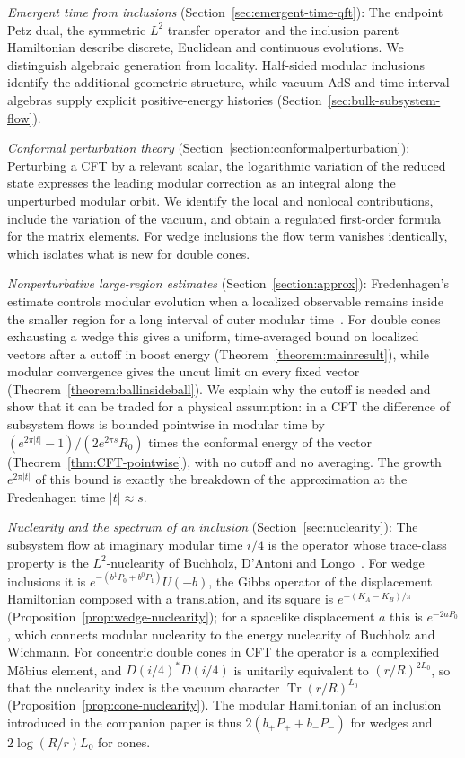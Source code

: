 \documentclass[a4paper,11pt]{article}
\theoremstyle{definition}
\begin{document}
\emph{Emergent time from inclusions} (Section~\ref{sec:emergent-time-qft}): The endpoint Petz dual, the symmetric $L^2$ transfer operator and the inclusion parent Hamiltonian describe discrete, Euclidean and continuous evolutions. We distinguish algebraic generation from locality. Half-sided modular inclusions identify the additional geometric structure, while vacuum AdS and time-interval algebras supply explicit positive-energy histories (Section~\ref{sec:bulk-subsystem-flow}).

\emph{Conformal perturbation theory} (Section~\ref{section:conformalperturbation}): Perturbing a CFT by a relevant scalar, the logarithmic variation of the reduced state expresses the leading modular correction as an integral along the unperturbed modular orbit. We identify the local and nonlocal contributions, include the variation of the vacuum, and obtain a regulated first-order formula for the matrix elements. For wedge inclusions the flow term vanishes identically, which isolates what is new for double cones.

\emph{Nonperturbative large-region estimates} (Section~\ref{section:approx}): Fredenhagen's estimate controls modular evolution when a localized observable remains inside the smaller region for a long interval of outer modular time~\cite{fredenhagen}. For double cones exhausting a wedge this gives a uniform, time-averaged bound on localized vectors after a cutoff in boost energy (Theorem~\ref{theorem:mainresult}), while modular convergence gives the uncut limit on every fixed vector (Theorem~\ref{theorem:ballinsideball}). We explain why the cutoff is needed and show that it can be traded for a physical assumption: in a CFT the difference of subsystem flows is bounded pointwise in modular time by $(e^{2\pi|t|}-1)/(2e^{2\pi s}R_0)$ times the conformal energy of the vector (Theorem~\ref{thm:CFT-pointwise}), with no cutoff and no averaging. The growth $e^{2\pi|t|}$ of this bound is exactly the breakdown of the approximation at the Fredenhagen time $|t|\approx s$.

\emph{Nuclearity and the spectrum of an inclusion} (Section~\ref{sec:nuclearity}): The subsystem flow at imaginary modular time $i/4$ is the operator whose trace-class property is the $L^2$-nuclearity of Buchholz, D'Antoni and Longo~\cite{BDL2007}. For wedge inclusions it is $e^{-(b^1P_0+b^0P_1)}U(-b)$, the Gibbs operator of the displacement Hamiltonian composed with a translation, and its square is $e^{-(K_A-K_B)/\pi}$ (Proposition~\ref{prop:wedge-nuclearity}); for a spacelike displacement $a$ this is $e^{-2aP_0}$, which connects modular nuclearity to the energy nuclearity of Buchholz and Wichmann. For concentric double cones in CFT the operator is a complexified M\"obius element, and $D(i/4)^*D(i/4)$ is unitarily equivalent to $(r/R)^{2L_0}$, so that the nuclearity index is the vacuum character $\operatorname{Tr}(r/R)^{L_0}$ (Proposition~\ref{prop:cone-nuclearity}). The modular Hamiltonian of an inclusion introduced in the companion paper is thus $2(b_+P_++b_-P_-)$ for wedges and $2\log(R/r)L_0$ for cones.
\end{document}
